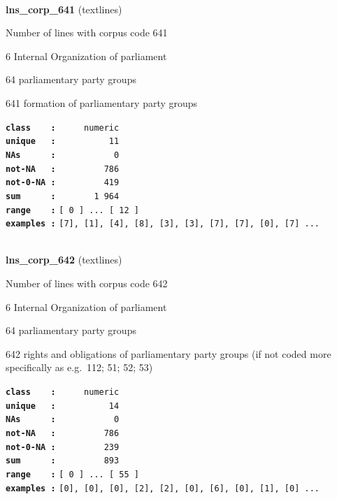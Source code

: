 \documentclass[]{article}
\begin{document}
~

\textbf{lns\_corp\_641} (textlines)

Number of lines with corpus code 641

6 Internal Organization of parliament

64 parliamentary party groups

641 formation of parliamentary party groups

\textbf{\texttt{class\ \ \ \ :}} \texttt{~~~~~numeric}\\
\textbf{\texttt{unique\ \ \ :}} \texttt{~~~~~~~~~~11}\\
\textbf{\texttt{NAs\ \ \ \ \ \ :}} \texttt{~~~~~~~~~~~0}\\
\textbf{\texttt{not-NA\ \ \ :}} \texttt{~~~~~~~~~786}\\
\textbf{\texttt{not-0-NA\ :}} \texttt{~~~~~~~~~419}\\
\textbf{\texttt{sum\ \ \ \ \ \ :}} \texttt{~~~~~~~1~964}\\
\textbf{\texttt{range\ \ \ \ :}}
\texttt{{[}\ 0\ {]}\ ...\ {[}\ 12\ {]}}\\
\textbf{\texttt{examples\ :}}
\texttt{{[}7{]},\ {[}1{]},\ {[}4{]},\ {[}8{]},\ {[}3{]},\ {[}3{]},\ {[}7{]},\ {[}7{]},\ {[}0{]},\ {[}7{]}\ ...}\\

~

\textbf{lns\_corp\_642} (textlines)

Number of lines with corpus code 642

6 Internal Organization of parliament

64 parliamentary party groups

642 rights and obligations of parliamentary party groups (if not coded
more specifically as e.g.~112; 51; 52; 53)

\textbf{\texttt{class\ \ \ \ :}} \texttt{~~~~~numeric}\\
\textbf{\texttt{unique\ \ \ :}} \texttt{~~~~~~~~~~14}\\
\textbf{\texttt{NAs\ \ \ \ \ \ :}} \texttt{~~~~~~~~~~~0}\\
\textbf{\texttt{not-NA\ \ \ :}} \texttt{~~~~~~~~~786}\\
\textbf{\texttt{not-0-NA\ :}} \texttt{~~~~~~~~~239}\\
\textbf{\texttt{sum\ \ \ \ \ \ :}} \texttt{~~~~~~~~~893}\\
\textbf{\texttt{range\ \ \ \ :}}
\texttt{{[}\ 0\ {]}\ ...\ {[}\ 55\ {]}}\\
\textbf{\texttt{examples\ :}}
\texttt{{[}0{]},\ {[}0{]},\ {[}0{]},\ {[}2{]},\ {[}2{]},\ {[}0{]},\ {[}6{]},\ {[}0{]},\ {[}1{]},\ {[}0{]}\ ...}\\
\end{document}

